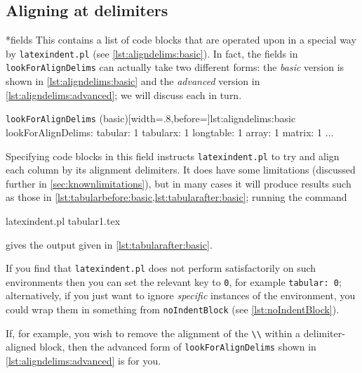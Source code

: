\documentclass[10pt]{article}
\begin{document}
\subsection{Aligning at delimiters}\label{subsec:align-at-delimiters}
*{fields}
 This contains a list of code blocks that are operated upon in a special way by
 \texttt{latexindent.pl} (see \cref{lst:aligndelims:basic}). In fact, the fields in
 \texttt{lookForAlignDelims} can actually take two different forms: the \emph{basic}
 version is shown in \cref{lst:aligndelims:basic} and the \emph{advanced} version in
 \cref{lst:aligndelims:advanced}; we will discuss each in turn.

 \begin{yaml}[numbers=none]{\texttt{lookForAlignDelims} (basic)}[width=.8\linewidth,before=\centering]{lst:aligndelims:basic}
lookForAlignDelims:
   tabular: 1
   tabularx: 1
   longtable: 1
   array: 1
   matrix: 1
   ...
	\end{yaml}

 Specifying code blocks in this field instructs \texttt{latexindent.pl} to try and align
 each column by its alignment delimiters. It does have some limitations (discussed
 further in \cref{sec:knownlimitations}), but in many cases it will produce results such
 as those in \cref{lst:tabularbefore:basic,lst:tabularafter:basic}; running the command

 \begin{commandshell}
latexindent.pl tabular1.tex   
 \end{commandshell}

 gives the output given in \cref{lst:tabularafter:basic}.

 \begin{cmhtcbraster}
 \end{cmhtcbraster}

 If you find that \texttt{latexindent.pl} does not perform satisfactorily on such
 environments then you can set the relevant key to \texttt{0}, for example
 \texttt{tabular: 0}; alternatively, if you just want to ignore \emph{specific} instances
 of the environment, you could wrap them in something from \texttt{noIndentBlock} (see
 \vref{lst:noIndentBlock}).

 If, for example, you wish to remove the alignment of the \lstinline!\\! within a
 delimiter-aligned block, then the advanced form of \texttt{lookForAlignDelims} shown in
 \cref{lst:aligndelims:advanced} is for you. 
    
\end{document}
